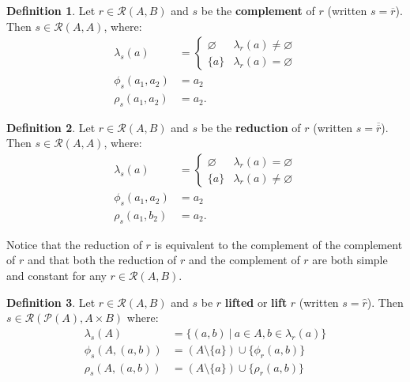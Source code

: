\documentclass{article}
\theoremstyle{definition}
\newtheorem{definition}{Definition}[subsection]
\theoremstyle{plain}
\def\rule{\mathcal{R}}
\begin{document}
\begin{definition}
  Let $ r \in \rule (A, B) $
  and $ s $ be the \textbf{complement} of $ r $
  (written $ s = \overline{r} $).
  Then $ s \in \rule (A, A) $, where:
  \begin{align}
    \lambda_s (a)    & = \begin{cases}
                           \varnothing & \lambda_r (a) \neq \varnothing \\
                           \{ a \}     & \lambda_r (a) = \varnothing
                         \end{cases} \\
       \phi_s (a_1, a_2) & = a_2 \\
       \rho_s (a_1, a_2) & = a_2.
  \end{align}
\end{definition}

\begin{definition}
  Let $ r \in \rule (A, B) $
  and $ s $ be the \textbf{reduction} of $ r $ 
  (written $ s = \overline{\overline{r}} $).
  Then $ s \in \rule (A, A) $, where:
  \begin{align}
    \lambda_s (a)    & = \begin{cases}
                           \varnothing & \lambda_r (a) = \varnothing \\
                           \{ a \}     & \lambda_r (a) \neq \varnothing
                         \end{cases} \\
       \phi_s (a_1, a_2) & = a_2 \\
       \rho_s (a_1, b_2) & = a_2.
  \end{align}
\end{definition}

Notice that the reduction of $ r $ is equivalent to the complement of the complement of $ r $
and that both the reduction of $ r $ and the complement of $ r $ are both simple and constant for any $ r \in \rule (A, B) $.

\begin{definition}
  Let $ r \in \rule (A, B) $
  and $ s $ be $ r $ \textbf{lifted}
  or \textbf{lift} $ r $
  (written $ s = \widehat{r} $).
  Then $ s \in \rule (\mathcal{P} (A), A \times B) $ where:
  \begin{align}
    \lambda_s (A)         & = \{(a, b) ~|~ a \in A, b \in \lambda_r (a) \} \\
       \phi_s (A, (a, b)) & = (A \setminus \{ a \} ) \cup \{ \phi_r (a, b) \} \\
       \rho_s (A, (a, b)) & = (A \setminus \{ a \} ) \cup \{ \rho_r (a, b) \} \\
  \end{align}
\end{definition}
\end{document}

